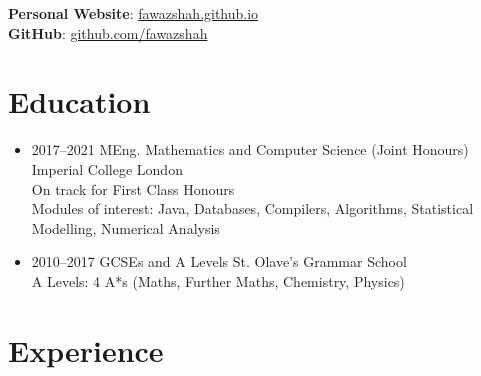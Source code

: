 \documentclass[11pt,a4paper,sans]{moderncv}        %
\begin{document}
\maketitle

\vspace{-40pt}

\begin{center}
\textbf{Personal Website}: \href{https://fawazshah.github.io/}{fawazshah.github.io} \\
\textbf{GitHub}: \href{https://github.com/fawazshah/}{github.com/fawazshah}
\end{center}

\section{Education}

\vspace{5pt}

\begin{itemize}

\item{
\cventry
{2017--2021}
{MEng. Mathematics and Computer Science (Joint Honours)}
{Imperial College London}
{}{}{
\noindent
\\
On track for First Class Honours
\\
Modules of interest: Java, Databases, Compilers, Algorithms, Statistical Modelling, Numerical Analysis
}
} %

\item{
\cventry
{2010--2017}
{GCSEs and A Levels}
{St. Olave's Grammar School}
{}{}{
\noindent
\\
A Levels: 4 A*s (Maths, Further Maths, Chemistry, Physics)
}}

\end{itemize}

\section{Experience}
\end{document}
